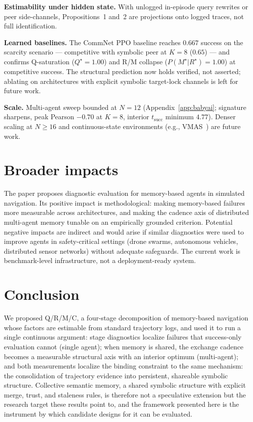 \documentclass{article}
\begin{document}
\textbf{Estimability under hidden state.} With unlogged in-episode query rewrites or peer side-channels, Propositions~1 and~2 are projections onto logged traces, not full identification.

\textbf{Learned baselines.} The CommNet PPO baseline reaches $0.667$ success on the scarcity scenario --- competitive with symbolic peer at $K{=}8$ ($0.65$) --- and confirms Q-saturation ($Q^\star{=}1.00$) and R/M collapse ($P(M^\star|R^\star){=}1.00$) at competitive success. The structural prediction now holds verified, not asserted; ablating on architectures with explicit symbolic target-lock channels is left for future work.

\textbf{Scale.} Multi-agent sweep bounded at $N{=}12$ (Appendix~\ref{app:babyai}; signature sharpens, peak Pearson $-0.70$ at $K{=}8$, interior $t_{\mathrm{succ}}$ minimum $4.77$). Denser scaling at $N{\ge}16$ and continuous-state environments (e.g., VMAS~\citep{bettini2022vmas}) are future work.

\section{Broader impacts}

The paper proposes diagnostic evaluation for memory-based agents in simulated navigation. Its positive impact is methodological: making memory-based failures more measurable across architectures, and making the cadence axis of distributed multi-agent memory tunable on an empirically grounded criterion. Potential negative impacts are indirect and would arise if similar diagnostics were used to improve agents in safety-critical settings (drone swarms, autonomous vehicles, distributed sensor networks) without adequate safeguards. The current work is benchmark-level infrastructure, not a deployment-ready system.

\section{Conclusion}

We proposed Q/R/M/C, a four-stage decomposition of memory-based
navigation whose factors are estimable from standard trajectory logs,
and used it to run a single continuous argument: stage diagnostics
localize failures that success-only evaluation cannot (single agent);
when memory is shared, the exchange cadence becomes a measurable
structural axis with an interior optimum (multi-agent); and both
measurements localize the binding constraint to the same mechanism:
the consolidation of trajectory evidence into persistent, shareable
symbolic structure. Collective semantic memory, a shared symbolic
structure with explicit merge, trust, and staleness rules, is
therefore not a speculative extension but the research target these
results point to, and the framework presented here is the instrument by
which candidate designs for it can be evaluated.
\end{document}
